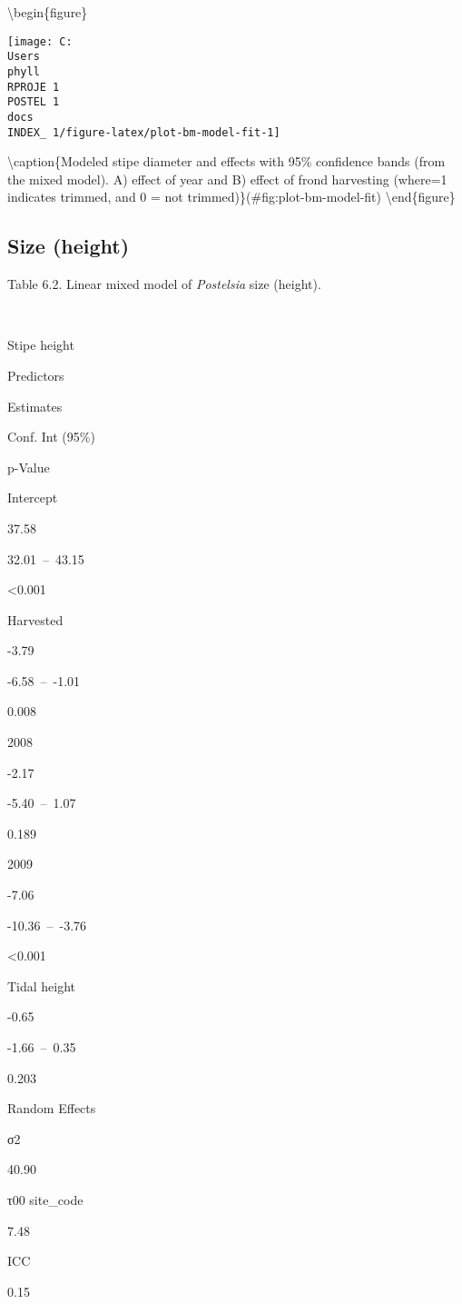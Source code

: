 \documentclass[
]{article}
\begin{document}
\textbackslash begin\{figure\}

\texttt{[image: C:\\Users\\phyll\\RPROJE~1\\POSTEL~1\\docs\\INDEX\_~1/figure-latex/plot-bm-model-fit-1]} \hfill{}

\textbackslash caption\{Modeled stipe diameter and effects with 95\% confidence bands (from the mixed model). A) effect of year and B) effect of frond harvesting (where=1 indicates trimmed, and 0 = not trimmed)\}(\#fig:plot-bm-model-fit)
\textbackslash end\{figure\}

\newpage

\hypertarget{size-height}{%
\subsection{Size (height)}\label{size-height}}

Table 6.2. Linear mixed model of \emph{Postelsia} size (height).

~

Stipe height

Predictors

Estimates

Conf. Int (95\%)

p-Value

Intercept

37.58

32.01~--~43.15

\textless0.001

Harvested

-3.79

-6.58~--~-1.01

0.008

2008

-2.17

-5.40~--~1.07

0.189

2009

-7.06

-10.36~--~-3.76

\textless0.001

Tidal height

-0.65

-1.66~--~0.35

0.203

Random Effects

σ2

40.90

τ00 site\_code

7.48

ICC

0.15
\end{document}
